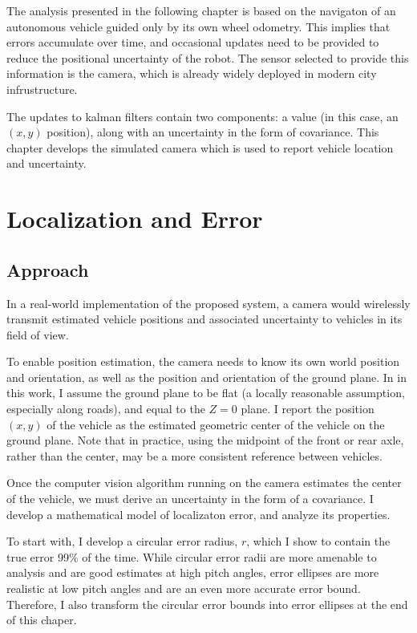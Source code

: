 \documentclass[a4paper,12pt,twoside,openright]{report}
\begin{document}
The analysis presented in the following chapter is based on the navigaton of an
autonomous vehicle guided only by its own wheel odometry. 
This implies that errors accumulate over time, and
occasional updates need to be provided to reduce the positional 
uncertainty of the robot. The sensor selected to provide this
information is the camera, which is already widely deployed
in modern city infrustructure.

The updates to kalman filters contain two components: a value (in this case, an $(x,y)$ position),
along with an uncertainty in the form of covariance. This chapter
develops the simulated camera which is used to report vehicle 
location and uncertainty.
 
\section{Localization and Error}

\subsection{Approach}

In a real-world implementation of the proposed system, a camera would wirelessly
transmit estimated vehicle positions and associated uncertainty to vehicles in its field of view.

To enable position estimation, the camera needs to know its own world position and orientation, 
as well as the position and orientation of the ground plane. In in this work,
I assume the ground plane to be flat (a locally reasonable assumption, especially along roads), 
and equal to the $Z = 0$ plane. I report the position $(x,y)$ of the vehicle
as the estimated geometric center of the vehicle on the ground plane. 
Note that in practice, using the midpoint of the front or rear axle, rather than the center, 
may be a more consistent reference between vehicles.

Once the computer vision algorithm running on the camera estimates the center of the vehicle,
we must derive an uncertainty in the form of a covariance. I develop a mathematical model of localizaton error,
and analyze its properties. 

To start with, I develop a circular error radius, $r$, which I show to contain
the true error 99\% of the time. While circular error radii are more amenable to analysis and are good
estimates at high pitch angles, error ellipses are more realistic at low pitch angles and are an 
even more accurate error bound. Therefore, I also transform the circular error bounds into error ellipses at the end of this chaper.
\end{document}
